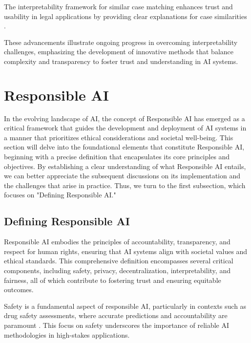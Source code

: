 The interpretability framework for similar case matching enhances trust and usability in legal applications by providing clear explanations for case similarities \cite{lin2023interpretabilityframeworksimilarcase}. 

These advancements illustrate ongoing progress in overcoming interpretability challenges, emphasizing the development of innovative methods that balance complexity and transparency to foster trust and understanding in AI systems.










\section{Responsible AI} \label{sec:Responsible AI}

In the evolving landscape of AI, the concept of Responsible AI has emerged as a critical framework that guides the development and deployment of AI systems in a manner that prioritizes ethical considerations and societal well-being. This section will delve into the foundational elements that constitute Responsible AI, beginning with a precise definition that encapsulates its core principles and objectives. By establishing a clear understanding of what Responsible AI entails, we can better appreciate the subsequent discussions on its implementation and the challenges that arise in practice. Thus, we turn to the first subsection, which focuses on "Defining Responsible AI." 





\subsection{Defining Responsible AI} \label{subsec:Defining Responsible AI}

Responsible AI embodies the principles of accountability, transparency, and respect for human rights, ensuring that AI systems align with societal values and ethical standards. This comprehensive definition encompasses several critical components, including safety, privacy, decentralization, interpretability, and fairness, all of which contribute to fostering trust and ensuring equitable outcomes.



Safety is a fundamental aspect of responsible AI, particularly in contexts such as drug safety assessments, where accurate predictions and accountability are paramount \cite{xi2022statisticallearningpreclinicaldrug}. This focus on safety underscores the importance of reliable AI methodologies in high-stakes applications.



